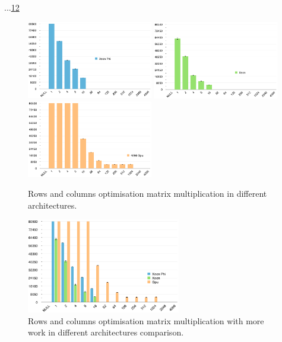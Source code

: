 \par{...\ref{RowsCols}\ref{RowsColsComp}}

\begin{figure}[!h]
    \centering
    \includegraphics[width=0.49\textwidth]{figures/opt3_phi.png}
    \includegraphics[width=0.49\textwidth]{figures/opt3_cpu.png}
    \includegraphics[width=0.49\textwidth]{figures/opt3_gpu.png}
    \caption{Rows and columns optimisation matrix multiplication in different architectures.}
    \label{RowsCols}
\end{figure}

\begin{figure}[!h]
    \centering
    \includegraphics[width=0.6\textwidth]{figures/opt3_comp.png}
    \caption{Rows and columns optimisation matrix multiplication with more work in different architectures comparison.}
    \label{RowsColsComp}
\end{figure}

